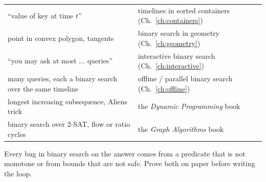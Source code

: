 \begin{tabularx}{\linewidth}{@{}>{\raggedright\arraybackslash}p{6.2cm} X@{}}
``value of key at time $t$'' & timelines in sorted containers (Ch.~\ref{ch:containers}) \\
point in convex polygon, tangents & binary search in geometry (Ch.~\ref{ch:geometry}) \\
``you may ask at most $\ldots$ queries'' & interactive binary search (Ch.~\ref{ch:interactive}) \\
many queries, each a binary search over the same timeline & offline / parallel binary search (Ch.~\ref{ch:offline}) \\
longest increasing subsequence, Aliens trick & the \textit{Dynamic Programming} book \\
binary search over 2-SAT, flow or ratio cycles & the \textit{Graph Algorithms} book \\
\bottomrule
\end{tabularx}
\endgroup

\begin{warningbox}
Every bug in binary search on the answer comes from a predicate that is not monotone or from bounds that are not safe. Prove both on paper before writing the loop.
\end{warningbox}
